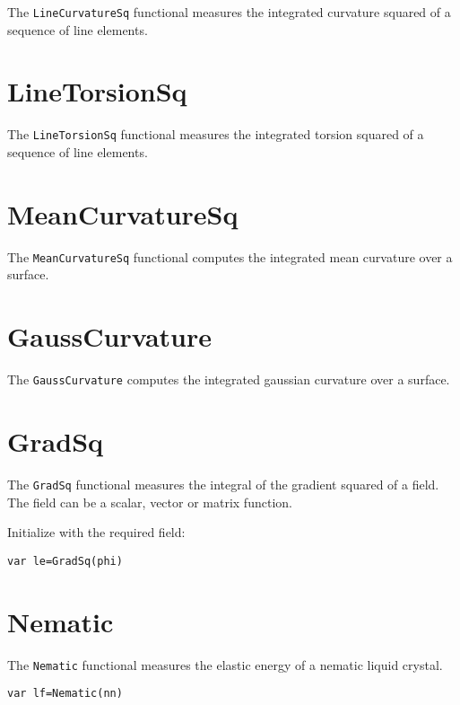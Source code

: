 The \texttt{LineCurvatureSq} functional measures the integrated
curvature squared of a sequence of line elements.

\hypertarget{linetorsionsq}{%
\section{LineTorsionSq}\label{linetorsionsq}}

The \texttt{LineTorsionSq} functional measures the integrated torsion
squared of a sequence of line elements.

\hypertarget{meancurvaturesq}{%
\section{MeanCurvatureSq}\label{meancurvaturesq}}

The \texttt{MeanCurvatureSq} functional computes the integrated mean
curvature over a surface.

\hypertarget{gausscurvature}{%
\section{GaussCurvature}\label{gausscurvature}}

The \texttt{GaussCurvature} computes the integrated gaussian curvature
over a surface.

\hypertarget{gradsq}{%
\section{GradSq}\label{gradsq}}

The \texttt{GradSq} functional measures the integral of the gradient
squared of a field. The field can be a scalar, vector or matrix
function.

Initialize with the required field:

\begin{lstlisting}
var le=GradSq(phi)
\end{lstlisting}

\hypertarget{nematic}{%
\section{Nematic}\label{nematic}}

The \texttt{Nematic} functional measures the elastic energy of a nematic
liquid crystal.

\begin{lstlisting}
var lf=Nematic(nn)
\end{lstlisting}

